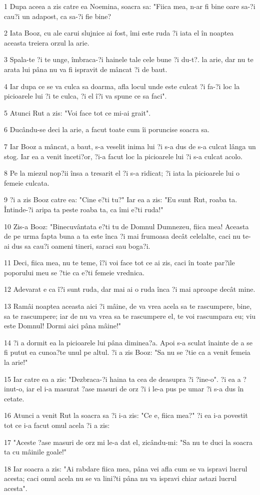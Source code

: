 \par 1 Dupa aceea a zis catre ea Noemina, soacra sa: "Fiica mea, n-ar fi bine oare sa-?i cau?i un adapost, ca sa-?i fie bine?
\par 2 Iata Booz, cu ale carui slujnice ai fost, îmi este ruda ?i iata el în noaptea aceasta treiera orzul la arie.
\par 3 Spala-te ?i te unge, îmbraca-?i hainele tale cele bune ?i du-t?. la arie, dar nu te arata lui pâna nu va fi ispravit de mâncat ?i de baut.
\par 4 Iar dupa ce se va culca sa doarma, afla locul unde este culcat ?i fa-?i loc la picioarele lui ?i te culca, ?i el î?i va spune ce sa faci".
\par 5 Atunci Rut a zis: "Voi face tot ce mi-ai grait".
\par 6 Ducându-se deci la arie, a facut toate cum îi poruncise soacra sa.
\par 7 Iar Booz a mâncat, a baut, s-a veselit inima lui ?i s-a dus de s-a culcat lânga un stog. Iar ea a venit înceti?or, ?i-a facut loc la picioarele lui ?i s-a culcat acolo.
\par 8 Pe la miezul nop?ii însa a tresarit el ?i s-a ridicat; ?i iata la picioarele lui o femeie culcata.
\par 9 ?i a zis Booz catre ea: "Cine e?ti tu?" Iar ea a zis: "Eu sunt Rut, roaba ta. Întinde-?i aripa ta peste roaba ta, ca îmi e?ti ruda!"
\par 10 Zis-a Booz: "Binecuvântata e?ti tu de Domnul Dumnezeu, fiica mea! Aceasta de pe urma fapta buna a ta este înca ?i mai frumoasa decât celelalte, caci nu te-ai dus sa cau?i oameni tineri, saraci sau boga?i.
\par 11 Deci, fiica mea, nu te teme, î?i voi face tot ce ai zis, caci în toate par?ile poporului meu se ?tie ca e?ti femeie vrednica.
\par 12 Adevarat e ca î?i sunt ruda, dar mai ai o ruda înca ?i mai aproape decât mine.
\par 13 Ramâi noaptea aceasta aici ?i mâine, de va vrea acela sa te rascumpere, bine, sa te rascumpere; iar de nu va vrea sa te rascumpere el, te voi rascumpara eu; viu este Domnul! Dormi aici pâna mâine!"
\par 14 ?i a dormit ea la picioarele lui pâna diminea?a. Apoi s-a sculat înainte de a se fi putut ea cunoa?te unul pe altul. ?i a zis Booz: "Sa nu se ?tie ca a venit femeia la arie!"
\par 15 Iar catre ea a zis: "Dezbraca-?i haina ta cea de deasupra ?i ?ine-o". ?i ea a ?inut-o, iar el i-a masurat ?ase masuri de orz ?i i le-a pus pe umar ?i s-a dus în cetate.
\par 16 Atunci a venit Rut la soacra sa ?i i-a zis: "Ce e, fiica mea?" ?i ea i-a povestit tot ce i-a facut omul acela ?i a zis:
\par 17 "Aceste ?ase masuri de orz mi le-a dat el, zicându-mi: "Sa nu te duci la soacra ta cu mâinile goale!"
\par 18 Iar soacra a zis: "Ai rabdare fiica mea, pâna vei afla cum se va ispravi lucrul acesta; caci omul acela nu se va lini?ti pâna nu va ispravi chiar astazi lucrul acesta".

